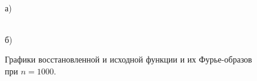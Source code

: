 \documentclass[a5paper, 10pt]{article}
\theoremstyle{definition}
\theoremstyle{plain}
\theoremstyle{remark}
\begin{document}
\begin{figure}[h!]
\begin{minipage}[h!]{0.5\linewidth}
 \\а)
\end{minipage}
\hfill
\begin{minipage}[h!]{0.5\linewidth}
 \\б)
\end{minipage}
\caption{ Графики восстановленной и исходной функции и их Фурье-образов при $n=1000$.}
\end{figure}
\end{document}

